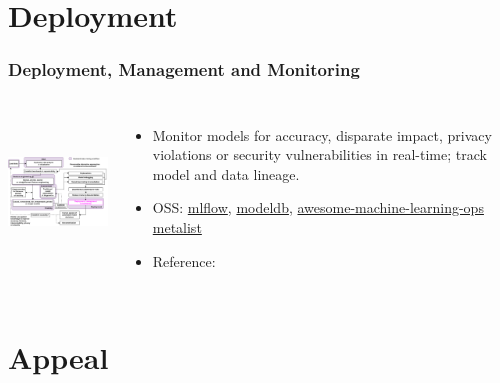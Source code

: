\documentclass[11pt,
               aspectratio=169,
               hyperref={colorlinks}
               ]{beamer}
\begin{document}
	\section{Deployment}

		\begin{frame}

			\frametitle{Deployment, Management and Monitoring}		
			
			\begin{columns}
	
				\centering
				\includegraphics[height=120pt]{../img/deploy.png}
				
				\vspace{-5pt}
				\begin{itemize}
					\item Monitor models for accuracy, disparate impact, privacy violations or security vulnerabilities in real-time; track model and data lineage.
					\item OSS: \href{https://github.com/mlflow/mlflow}{mlflow}, \href{https://github.com/mitdbg/modeldb}{modeldb}, \href{https://github.com/EthicalML/awesome-machine-learning-operations}{awesome-machine-learning-ops metalist}
					\item Reference: 
				\end{itemize}
				
			\end{columns}
		
		\end{frame}

	\section{Appeal}
\end{document}
